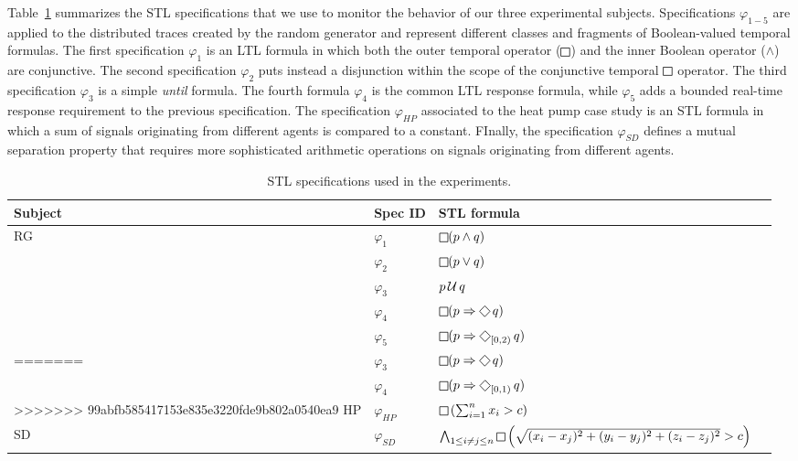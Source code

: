 Table~\ref{tab:spec} summarizes the STL specifications that we use to monitor the behavior of our three experimental subjects. Specifications $\varphi_{1-5}$ are applied to the distributed traces created by the random generator and represent different classes and fragments of Boolean-valued temporal formulas. The first specification $\varphi_1$ is an LTL formula in which both the outer temporal operator ($\LTLg$) and the inner Boolean operator ($\wedge$) are conjunctive. The second specification $\varphi_2$ puts instead a disjunction within the scope of the conjunctive temporal $\LTLg$ operator. The third specification $\varphi_3$ is a simple \emph{until} formula. The fourth formula $\varphi_4$ is the common LTL response formula, while $\varphi_5$ adds a bounded real-time response requirement to the previous specification. The specification $\varphi_{HP}$ associated to the heat pump case study is an STL formula in which a sum of signals originating from different agents is compared to a constant. FInally, the specification $\varphi_{SD}$ defines a mutual separation property that requires more sophisticated arithmetic operations on signals originating from different agents.  

\begin{table}
\centering
\begin{tabular}{|l|l|l|l|}
\hline
Subject & Spec ID & STL formula \\
\hline
\multirow{ 5}{*}{RG}
& $\varphi_1$ & $\LTLg (p \wedge q)$  \\
& $\varphi_2$ & $\LTLg (p \vee q)$ & \\
<<<<<<< HEAD
& $\varphi_3$ & $ p \operatorname{\mathcal{U}} q$ & \\
& $\varphi_4$ & $\LTLg (p \Rightarrow \LTLf q)$ \\
& $\varphi_5$ & $\LTLg (p \Rightarrow \LTLf_{[0,2)} q)$  \\
=======
& $\varphi_3$ & $\LTLg (p \Rightarrow \LTLf q)$ & \\
& $\varphi_4$ & $\LTLg (p \Rightarrow \LTLf_{[0,1)} q)$  & \\
>>>>>>> 99abfb585417153e835e3220fde9b802a0540ea9
\hline
HP & $\varphi_{HP}$ & $\LTLg \left(\sum_{i=1}^{n} x_i  > c\right)$  \\
SD & $\varphi_{SD}$ & $\bigwedge_{1 \leq i \neq j \leq n} \LTLg \left( \sqrt{(x_i-x_j)^2 + (y_i-y_j)^2 + (z_i-z_j)^2} > c \right)$   \\
\hline
\end{tabular}
\caption{STL specifications used in the experiments.}
\label{tab:spec} 
\end{table}

